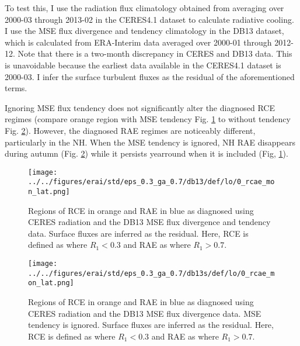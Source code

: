 \documentclass[11pt]{article}
\begin{document}
To test this, I use the radiation flux climatology obtained from averaging over 2000-03 through 2013-02 in the CERES4.1 dataset to calculate radiative cooling. I use the MSE flux divergence and tendency climatology in the DB13 dataset, which is calculated from ERA-Interim data averaged over 2000-01 through 2012-12. Note that there is a two-month discrepancy in CERES and DB13 data. This is unavoidable because the earliest data available in the CERES4.1 dataset is 2000-03. I infer the surface turbulent fluxes as the residual of the aforementioned terms.

Ignoring MSE flux tendency does not significantly alter the diagnosed RCE regimes (compare orange region with MSE tendency Fig. \ref{fig:org0dd4041} to without tendency Fig. \ref{fig:orgf832265}). However, the diagnosed RAE regimes are noticeably different, particularly in the NH. When the MSE tendency is ignored, NH RAE disappears during autumn (Fig. \ref{fig:orgf832265}) while it persists yearround when it is included (Fig, \ref{fig:org0dd4041}).

\begin{figure}[htbp]
\centering
\texttt{[image: ../../figures/erai/std/eps\_0.3\_ga\_0.7/db13/def/lo/0\_rcae\_mon\_lat.png]}
\caption{\label{fig:org0dd4041}Regions of RCE in orange and RAE in blue as diagnosed using CERES radiation and the DB13 MSE flux divergence and tendency data. Surface fluxes are inferred as the residual. Here, RCE is defined as where \(R_1 < 0.3\) and RAE as where \(R_1 > 0.7\).}
\end{figure}

\begin{figure}[htbp]
\centering
\texttt{[image: ../../figures/erai/std/eps\_0.3\_ga\_0.7/db13s/def/lo/0\_rcae\_mon\_lat.png]}
\caption{\label{fig:orgf832265}Regions of RCE in orange and RAE in blue as diagnosed using CERES radiation and the DB13 MSE flux divergence data. MSE tendency is ignored. Surface fluxes are inferred as the residual. Here, RCE is defined as where \(R_1 < 0.3\) and RAE as where \(R_1 > 0.7\).}
\end{figure}
\end{document}
